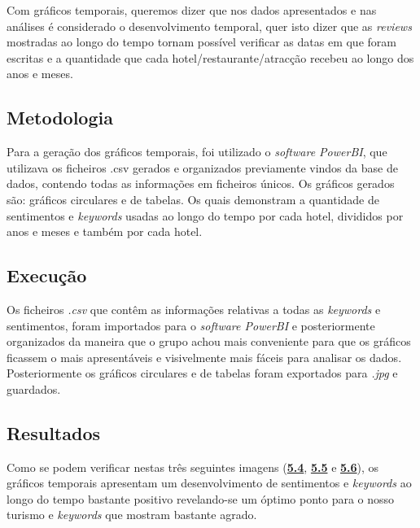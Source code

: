 Com gráficos temporais, queremos dizer que nos dados apresentados e nas análises é considerado o desenvolvimento temporal, quer isto dizer que as \textit{reviews} mostradas ao longo do tempo tornam possível verificar as datas em que foram escritas e a quantidade que cada hotel/restaurante/atracção recebeu ao longo dos anos e meses.

\subsection{Metodologia}

Para a geração dos gráficos temporais, foi utilizado o \textit{software PowerBI}, que utilizava os ficheiros .csv gerados e organizados previamente vindos da base de dados, contendo todas as informações em ficheiros únicos.
Os gráficos gerados são: gráficos circulares e de tabelas. Os quais demonstram a quantidade de sentimentos e \textit{keywords} usadas ao longo do tempo por cada hotel, divididos por anos e meses e também por cada hotel.

\subsection{Execução}

Os ficheiros \textit{.csv} que contêm as informações relativas a todas as \textit{keywords} e sentimentos, foram importados para o \textit{software PowerBI} e posteriormente organizados da maneira que o grupo achou mais conveniente para que os gráficos ficassem o mais apresentáveis e visivelmente mais fáceis para analisar os dados. Posteriormente os gráficos circulares e de tabelas foram exportados para \textit{.jpg} e guardados. 

\subsection{Resultados}

Como se podem verificar nestas três seguintes imagens (\hyperref[fig:exemplofigqntsntmyear]{\textbf{5.4}}, \hyperref[fig:exemplofigqntyearbus]{\textbf{5.5}} e \hyperref[fig:exemplofigposneg]{\textbf{5.6}}), os gráficos temporais apresentam um desenvolvimento de sentimentos e \textit{keywords} ao longo do tempo bastante positivo revelando-se um óptimo ponto para o nosso turismo e \textit{keywords} que mostram bastante agrado. 

